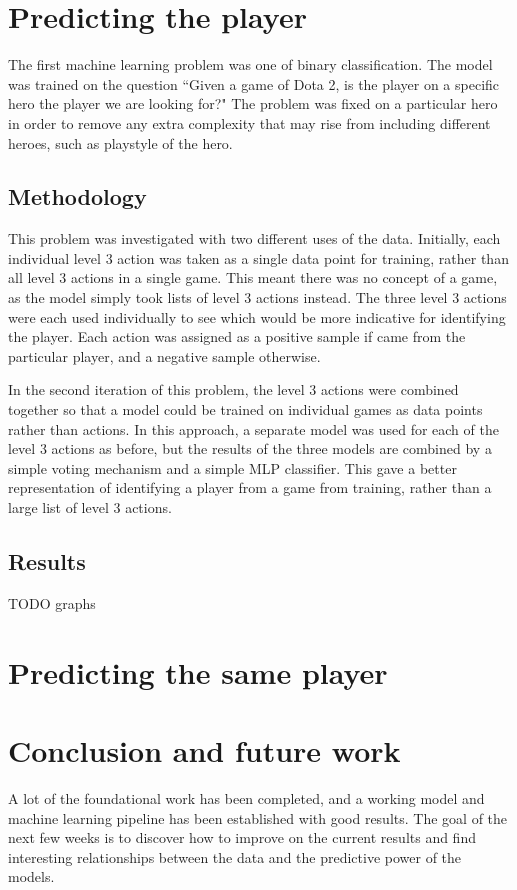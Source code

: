 \documentclass{../sty/SizheArticle}
\begin{document}
\section{Predicting the player}
The first machine learning problem was one of binary classification. The model was trained on the question ``Given a game of Dota 2, is the player on a specific hero the player we are looking for?" The problem was fixed on a particular hero in order to remove any extra complexity that may rise from including different heroes, such as playstyle of the hero. 


\subsection{Methodology}
This problem was investigated with two different uses of the data.  Initially, each individual level 3 action was taken as a single data point for training, rather than all level 3 actions in a single game. This meant there was no concept of a game, as the model simply took lists of level 3 actions instead. The three level 3 actions were each used individually to see which would be more indicative for identifying the player. Each action was assigned as a positive sample if came from the particular player, and a negative sample otherwise. 

In the second iteration of this problem, the level 3 actions were combined together so that a model could be trained on individual games as data points rather than actions. In this approach, a separate model was used for each of the level 3 actions as before, but the results of the three models are combined by a simple voting mechanism and a simple MLP classifier. This gave a better representation of identifying a player from a game from training, rather than a large list of level 3 actions.
\subsection{Results}
TODO graphs



\section{Predicting the same player}




\section{Conclusion and future work}
A lot of the foundational work has been completed, and a working model and machine learning pipeline has been established with good results. The goal of the next few weeks is to discover how to improve on the current results and find interesting relationships between the data and the predictive power of the models. 
\end{document}
